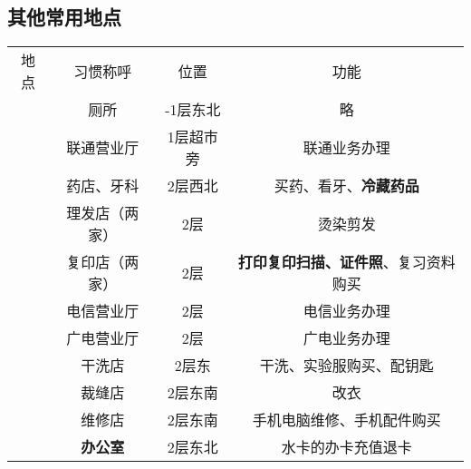 \subsection[其他常用地点]{其他常用地点}
\label{common_locations}
\begin{table}[H]
    \vspace{-1em}
    \centering
    \begin{tabular}{|c|c|c|c|}
        \Xhline{1.2pt}
        地点                    & 习惯称呼                         & 位置     & 功能           \\
        \Xhline{1.2pt}
        \multirow{9}{*}{大服}   & 厕所                           & -1层东北  & 略            \\
        \cline{2-4}
                              & 联通营业厅                        & 1层超市旁                 %
                              & 联通业务办理                                               \\
        \cline{2-4}
                              & 药店、牙科                        & 2层西北                  %
                              & 买药、看牙、\textbf{冷藏药品}                                  \\
        \cline{2-4}
                              & 理发店（两家）                      & 2层     & 烫染剪发         \\
        \cline{2-4}
                              & 复印店（两家）                      & 2层                    %
                              & \textbf{打印复印扫描、证件照}、复习资料购买                           \\
        \cline{2-4}
                              & 电信营业厅                        & 2层     & 电信业务办理       \\
        \cline{2-4}
                              & 广电营业厅                        & 2层     & 广电业务办理       \\
        \cline{2-4}
                              & 干洗店                          & 2层东    & 干洗、实验服购买、配钥匙 \\
        \cline{2-4}
                              & 裁缝店                          & 2层东南   & 改衣           \\
        \cline{2-4}
                              & 维修店                          & 2层东南                  %
                              & 手机电脑维修、手机配件购买                                        \\
        \cline{2-4}
                              & \textbf{办公室}                 & 2层东北   & 水卡的办卡充值退卡    \\

\end{tabular}
\end{table}
